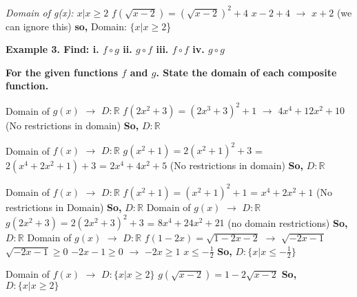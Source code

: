 \documentclass{report}
\begin{document}
\bigbreak
\textit{Domain of g(x): $ x | x \ge 2$}
\bigbreak
$f(\sqrt{x-2}) = (\sqrt{x-2})^2+4$
\bigbreak
$ x-2+4$ $\rightarrow$ $x+2$ (we can ignore this)
\bigbreak
\textbf{so,} Domain: $ \{x | x \ge 2$\}
\bigbreak \noindent \bigbreak \noindent
\begin{mdframed}
 \begin{center}
	 \textbf{Example 3. Find: i. $f \circ g$ ii. $g \circ f$ iii. $f \circ f$ iv. $g \circ g$}
 \end{center} 
\end{mdframed}
\begin{large}
	\begin{center}
\textbf{For the given functions $f$ and $g$. State the domain of each composite function.} 
	\end{center}
\end{large}
\bigbreak

Domain of $g(x)$ $\rightarrow$ $D:\mathbb{R}$
\bigbreak
$f(2x^2+3) = (2x^3+3)^2 + 1$
\bigbreak
$\rightarrow$ $4x^4+12x^2+10$ (No restrictions in domain)
\bigbreak
\textbf{So,} $D:\mathbb{R}$
\bigbreak
{}
\bigbreak

Domain of $f(x)$ $\rightarrow$ $D:\mathbb{R}$
\bigbreak
$g(x^2+1) = 2(x^2+1)^2+3$
\bigbreak
= $2(x^4+2x^2+1)+3$
\bigbreak
= $2x^4+4x^2+5$ (No restrictions in domain)
\bigbreak
\textbf{So,} $D:\mathbb{R}$
\bigbreak
{}
\bigbreak

Domain of $f(x)$ $\rightarrow$ $D:\mathbb{R}$
\bigbreak
$f(x^2+1) = (x^2+1)^2+1$
\bigbreak
= $x^4+2x^2+1$ (No restrictions in Domain)
\bigbreak
\textbf{So,} $D:\mathbb{R}$
\bigbreak
Domain of $g(x)$ $\rightarrow$ $D:\mathbb{R}$
\bigbreak
$g(2x^2+3) = 2(2x^2+3)^2+3$
\bigbreak
= $8x^4+24x^2+21$ (no domain restrictions)
\bigbreak
\textbf{So,} $D:\mathbb{R}$
\bigbreak \bigbreak
{}
\bigbreak
Domain of $g(x)$ $\rightarrow$ $D:\mathbb{R}$
\bigbreak
$f(1-2x) = \sqrt{1-2x-2}$ $\rightarrow$ $\sqrt{-2x-1}$
\bigbreak
$\sqrt{-2x-1} \ge 0$
\bigbreak
$-2x-1 \ge 0$ $\rightarrow$ $-2x \ge 1$
\bigbreak
$x \le -\frac{1}{2}$
\bigbreak
\textbf{So,} $D:\{x | x \le -\frac{1}{2}\}$
\bigbreak
{}
\bigbreak

Domain of $f(x)$ $\rightarrow$ $ D:\{x | x \ge 2\}$
\bigbreak
$g(\sqrt{x-2}) = 1-2\sqrt{x-2}$
\bigbreak
\textbf{So,} $D: \{x | x \ge 2\}$
\bigbreak

	
\end{document}
